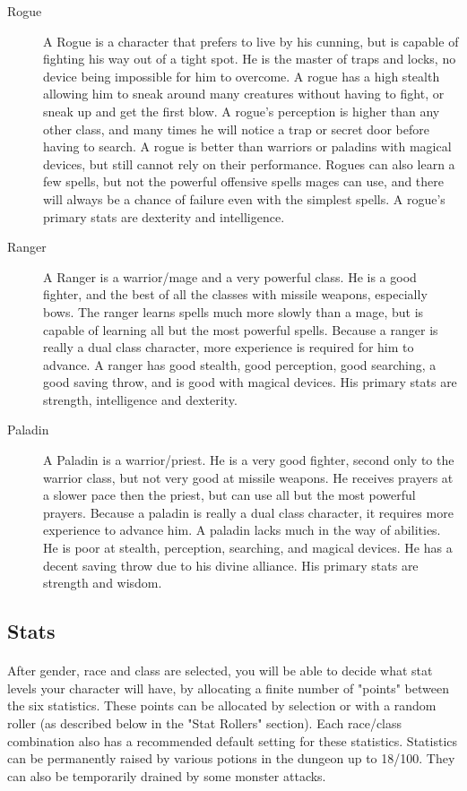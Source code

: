 \begin{description}
 \item[Rogue] A Rogue is a character that prefers to live by his cunning,
     but is capable of fighting his way out of a tight spot. He
     is the master of traps and locks, no device being impossible
     for him to overcome. A rogue has a high stealth allowing
     him to sneak around many creatures without having to fight,
     or sneak up and get the first blow. A rogue's perception is
     higher than any other class, and many times he will notice a
     trap or secret door before having to search. A rogue is
     better than warriors or paladins with magical devices, but
     still cannot rely on their performance. Rogues can also
     learn a few spells, but not the powerful offensive spells
     mages can use, and there will always be a chance of failure
     even with the simplest spells. A rogue's primary stats are
     dexterity and intelligence.

 \item[Ranger] A Ranger is a warrior/mage and a very powerful class. He is
     a good fighter, and the best of all the classes with missile
     weapons, especially bows. The ranger learns spells much more
     slowly than a mage, but is capable of learning all but the
     most powerful spells. Because a ranger is really a dual
     class character, more experience is required for him to
     advance. A ranger has good stealth, good perception, good
     searching, a good saving throw, and is good with magical
     devices. His primary stats are strength, intelligence and
     dexterity.

 \item[Paladin] A Paladin is a warrior/priest. He is a very good fighter,
     second only to the warrior class, but not very good at missile
     weapons. He receives prayers at a slower pace then the
     priest, but can use all but the most powerful prayers.
     Because a paladin is really a dual class character, it
     requires more experience to advance him. A paladin lacks
     much in the way of abilities. He is poor at stealth, perception,
     searching, and magical devices. He has a decent
     saving throw due to his divine alliance. His primary stats
     are strength and wisdom.
\end{description} 

\subsection{Stats}
\paragraph{}
After gender, race and class are selected, you will be able to decide
what stat levels your character will have, by allocating a finite number
of "points" between the six statistics. These points can be allocated
by selection or with a random roller (as described below in the "Stat
Rollers" section). Each race/class combination also has a recommended
default setting for these statistics. Statistics can be permanently
raised by various potions in the dungeon up to 18/100. They can also be
temporarily drained by some monster attacks.

